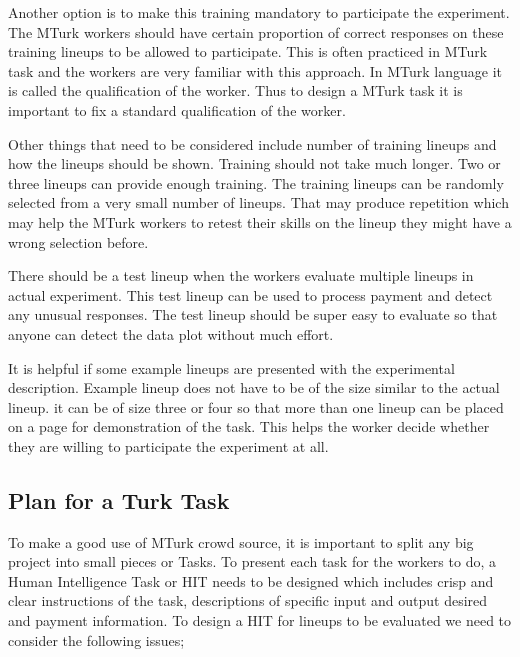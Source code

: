 \documentclass[11pt]{article}
\begin{document}
Another option is to make this training mandatory to participate the experiment. The MTurk workers should have certain proportion of correct responses on these training lineups to be allowed to participate. This is often practiced in MTurk task and the workers are very familiar with this approach. In MTurk language it is called the qualification of the worker. Thus to design a MTurk task it is important to fix a standard qualification of the worker.

Other things that need to be considered include number of training lineups and how the lineups should be shown. Training should not take much longer. Two or three lineups can provide enough training. The training lineups can be randomly selected from a very small number of lineups. That may produce repetition which may help the MTurk workers to retest their skills on the lineup they might have a wrong selection before. 

There should be a test lineup when the workers evaluate multiple lineups in actual experiment. This test lineup can be used to process payment and detect any unusual responses. The test lineup should be super easy to evaluate so that anyone can detect the data plot without much effort.

It is helpful if some example lineups are presented with the experimental description. Example lineup does not have to be of the size similar to the actual lineup. it can be of size three or four so that more than one lineup can be placed on a page for demonstration of the task. This helps the worker decide whether they are willing to participate the experiment at all.

\subsection{Plan for a Turk Task} \label{sec:task_plan} To make a good use of MTurk crowd source, it is important to split any big project into small pieces or Tasks. To present each task for the workers to do, a Human Intelligence Task or HIT needs to be designed which includes crisp and clear instructions of the task, descriptions of specific input and output desired and payment information. To design a HIT for lineups to be evaluated we need to consider the following issues;
\end{document}
